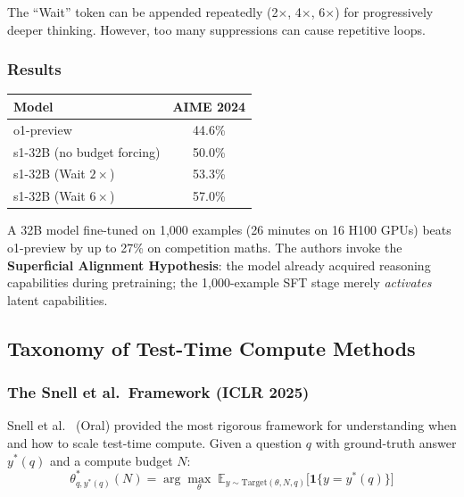 \documentclass[11pt, a4paper]{article}
\theoremstyle{definition}
\theoremstyle{plain}
\newcommand{\E}{\mathbb{E}}
\begin{document}
The ``Wait'' token can be appended repeatedly (2$\times$, 4$\times$, 6$\times$) for progressively deeper thinking. However, too many suppressions can cause repetitive loops.

\subsubsection{Results}

\begin{center}
\begin{tabular}{lc}
  \toprule
  \textbf{Model} & \textbf{AIME 2024} \\
  \midrule
  o1-preview & 44.6\% \\
  s1-32B (no budget forcing) & 50.0\% \\
  s1-32B (Wait $2\times$) & 53.3\% \\
  s1-32B (Wait $6\times$) & 57.0\% \\
  \bottomrule
\end{tabular}
\end{center}

A 32B model fine-tuned on 1,000 examples (26 minutes on 16 H100 GPUs) beats o1-preview by up to 27\% on competition maths. The authors invoke the \textbf{Superficial Alignment Hypothesis}: the model already acquired reasoning capabilities during pretraining; the 1,000-example SFT stage merely \emph{activates} latent capabilities.

\subsection{Taxonomy of Test-Time Compute Methods}
\label{subsec:ttc-taxonomy}

\subsubsection{The Snell et al.\ Framework (ICLR 2025)}

Snell et al.~\cite{snell2025scaling} (Oral) provided the most rigorous framework for understanding when and how to scale test-time compute. Given a question $q$ with ground-truth answer $y^*(q)$ and a compute budget $N$:
\begin{equation}
  \theta^*_{q, y^*(q)}(N) = \arg\max_{\theta}\; \E_{y \sim \text{Target}(\theta, N, q)}\bigl[\mathbf{1}\{y = y^*(q)\}\bigr]
\end{equation}
\end{document}
